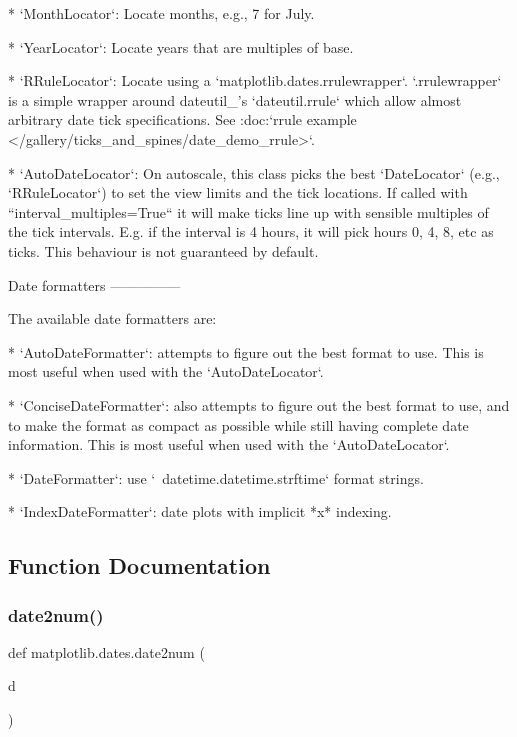 \begin{DoxyVerb}
* `MonthLocator`: Locate months, e.g., 7 for July.

* `YearLocator`: Locate years that are multiples of base.

* `RRuleLocator`: Locate using a `matplotlib.dates.rrulewrapper`.
  `.rrulewrapper` is a simple wrapper around dateutil_'s `dateutil.rrule` which
  allow almost arbitrary date tick specifications.  See :doc:`rrule example
  </gallery/ticks_and_spines/date_demo_rrule>`.

* `AutoDateLocator`: On autoscale, this class picks the best `DateLocator`
  (e.g., `RRuleLocator`) to set the view limits and the tick locations.  If
  called with ``interval_multiples=True`` it will make ticks line up with
  sensible multiples of the tick intervals.  E.g. if the interval is 4 hours,
  it will pick hours 0, 4, 8, etc as ticks.  This behaviour is not guaranteed
  by default.

Date formatters
---------------

The available date formatters are:

* `AutoDateFormatter`: attempts to figure out the best format to use.  This is
  most useful when used with the `AutoDateLocator`.

* `ConciseDateFormatter`: also attempts to figure out the best format to use,
  and to make the format as compact as possible while still having complete
  date information.  This is most useful when used with the `AutoDateLocator`.

* `DateFormatter`: use `~datetime.datetime.strftime` format strings.

* `IndexDateFormatter`: date plots with implicit *x* indexing.
\end{DoxyVerb}
 

\subsection{Function Documentation}
\mbox{\label{namespacematplotlib_1_1dates_a48721f97cdd620c5cc7573a689f2793c}} 
\subsubsection{\texorpdfstring{date2num()}{date2num()}}
{\footnotesize\ttfamily def matplotlib.\+dates.\+date2num (\begin{DoxyParamCaption}\item[{}]{d }\end{DoxyParamCaption})}

